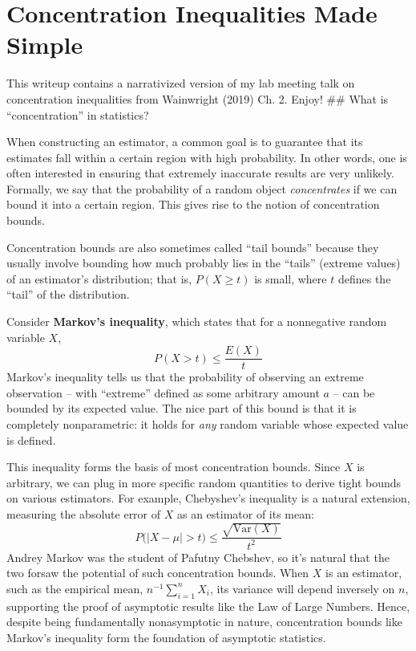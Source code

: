 \documentclass[
]{article}
\author{}
\date{}
\begin{document}
\hypertarget{concentration-inequalities-made-simple}{%
\section{Concentration Inequalities Made
Simple}\label{concentration-inequalities-made-simple}}

This writeup contains a narrativized version of my lab meeting talk on
concentration inequalities from Wainwright (2019) Ch. 2. Enjoy! \#\#
What is ``concentration'' in statistics?

When constructing an estimator, a common goal is to guarantee that its
estimates fall within a certain region with high probability. In other
words, one is often interested in ensuring that extremely inaccurate
results are very unlikely. Formally, we say that the probability of a
random object \emph{concentrates} if we can bound it into a certain
region. This gives rise to the notion of concentration bounds.

Concentration bounds are also sometimes called ``tail bounds'' because
they usually involve bounding how much probably lies in the ``tails''
(extreme values) of an estimator's distribution; that is,
\(P(X \geq t)\) is small, where \(t\) defines the ``tail'' of the
distribution.

Consider \textbf{Markov's inequality}, which states that for a
nonnegative random variable \(X\), \[P(X > t) \leq \frac{E(X)}{t}\]
Markov's inequality tells us that the probability of observing an
extreme observation -- with ``extreme'' defined as some arbitrary amount
\(a\) -- can be bounded by its expected value. The nice part of this
bound is that it is completely nonparametric: it holds for \emph{any}
random variable whose expected value is defined.

This inequality forms the basis of most concentration bounds. Since
\(X\) is arbitrary, we can plug in more specific random quantities to
derive tight bounds on various estimators. For example, Chebyshev's
inequality is a natural extension, measuring the absolute error of \(X\)
as an estimator of its mean:
\[P\Big(|X - \mu| > t\Big) \leq \frac{\sqrt{\text{Var}(X)}}{t^2}\]
Andrey Markov was the student of Pafutny Chebshev, so it's natural that
the two forsaw the potential of such concentration bounds. When \(X\) is
an estimator, such as the empirical mean, \(n^{-1} \sum_{i=1}^n X_i\),
its variance will depend inversely on \(n\), supporting the proof of
asymptotic results like the Law of Large Numbers. Hence, despite being
fundamentally nonasymptotic in nature, concentration bounds like
Markov's inequality form the foundation of asymptotic statistics.
\end{document}
